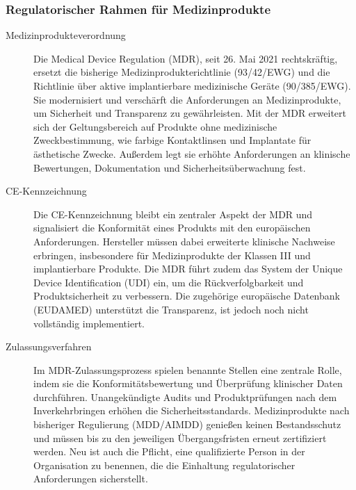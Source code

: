 \documentclass[a4paper, 12pt]{article}
\begin{document}
\subsubsection{Regulatorischer Rahmen für Medizinprodukte}\label{mdr_regulations}
\begin{description}
	\item[Medizinprodukteverordnung]
	Die Medical Device Regulation (MDR), seit 26. Mai 2021 rechtskräftig, ersetzt die 		bisherige Medizinprodukterichtlinie (93/42/EWG) und die Richtlinie über aktive implantierbare medizinische Geräte (90/385/EWG). Sie modernisiert und verschärft die Anforderungen an Medizinprodukte, um Sicherheit und Transparenz zu gewährleisten. Mit der MDR erweitert sich der Geltungsbereich auf Produkte ohne medizinische Zweckbestimmung, wie farbige Kontaktlinsen und Implantate für ästhetische Zwecke. Außerdem legt sie erhöhte Anforderungen an klinische Bewertungen, Dokumentation und Sicherheitsüberwachung fest.
	
	\item[CE-Kennzeichnung]
	Die CE-Kennzeichnung bleibt ein zentraler Aspekt der MDR und signalisiert die Konformität eines Produkts mit den europäischen Anforderungen. Hersteller müssen dabei erweiterte klinische Nachweise erbringen, insbesondere für Medizinprodukte der Klassen III und implantierbare Produkte. Die MDR führt zudem das System der Unique Device Identification (UDI) ein, um die Rückverfolgbarkeit und Produktsicherheit zu verbessern. Die zugehörige europäische Datenbank (EUDAMED) unterstützt die Transparenz, ist jedoch noch nicht vollständig implementiert.
	
	\item[Zulassungsverfahren]
	Im MDR-Zulassungsprozess spielen benannte Stellen eine zentrale Rolle, indem sie die Konformitätsbewertung und Überprüfung klinischer Daten durchführen. Unangekündigte Audits und Produktprüfungen nach dem Inverkehrbringen erhöhen die Sicherheitsstandards. Medizinprodukte nach bisheriger Regulierung (MDD/AIMDD) genießen keinen Bestandsschutz und müssen bis zu den jeweiligen Übergangsfristen erneut zertifiziert werden. Neu ist auch die Pflicht, eine qualifizierte Person in der Organisation zu benennen, die die Einhaltung regulatorischer Anforderungen sicherstellt.
	
\end{description}
\cite{tüv_süd_mdr}
\end{document}
